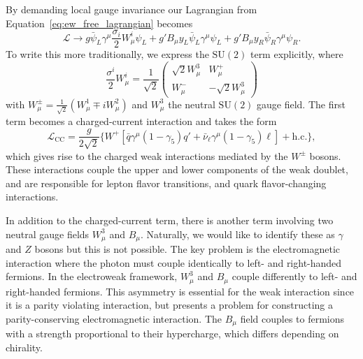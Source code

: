 By demanding local gauge invariance our Lagrangian from Equation~\ref{eq:ew_free_lagrangian} becomes 
\begin{equation}
  \mathcal{L} \to g\bar{\psi}_{L}\gamma^{\mu}\frac{\sigma_{i}}{2}W_{\mu}^{i}\psi_{L} + g'B_{\mu}y_{L}\bar{\psi}_{L}\gamma^{\mu}\psi_{L} + g'B_{\mu}y_{R}\bar{\psi}_{R}\gamma^{\mu}\psi_{R}.
  \label{eq:ew_lagrangian}
\end{equation}
To write this more traditionally, we express the $\mathrm{SU}(2)$ term explicitly, where
\begin{equation}
  \frac{\sigma^{i}}{2}W_{\mu}^{i} = \frac{1}{\sqrt{2}}\begin{pmatrix}
    \sqrt{2}W_{\mu}^{3} &  W_{\mu}^{+} \\
    W_{\mu}^{-} & -\sqrt{2}W_{\mu}^{3}
  \end{pmatrix}
\end{equation}
with $W_{\mu}^{\pm} = \frac{1}{\sqrt{2}}(W_{\mu}^{1} \mp iW_{\mu}^{2})$ and $W_{\mu}^{3}$ the neutral $\mathrm{SU}(2)$ gauge field. The first term becomes a charged-current interaction and takes the form
\begin{equation}
  \mathcal{L}_{\mathrm{CC}} = \frac{g}{2\sqrt{2}}\{W^{+}[\bar{q}\gamma^{\mu}(1-\gamma_{5})q' + \bar{\nu}_{\ell}\gamma^{\mu}(1 - \gamma_{5})\ell] + \mathrm{h.c.}\},
  \label{eq:ew_cc_lagrangian}
\end{equation}
which gives rise to the charged weak interactions mediated by the $W^{\pm}$ bosons. These interactions couple the upper and lower components of the weak doublet, and are responsible for lepton flavor transitions, and quark flavor-changing interactions. 

In addition to the charged-current term, there is another term involving two neutral gauge fields $W^{3}_{\mu}$ and $B_{\mu}$. Naturally, we would like to identify these as $\gamma$ and $Z$ bosons but this is not possible. The key problem is the electromagnetic interaction where the photon must couple identically to left- and right-handed fermions. In the electroweak framework, $W^{3}_{\mu}$ and $B_{\mu}$ couple differently to left- and right-handed fermions. This asymmetry is essential for the weak interaction since it is a parity violating interaction, but presents a problem for constructing a parity-conserving electromagnetic interaction. The $B_{\mu}$ field couples to fermions with a strength proportional to their hypercharge, which differs depending on chirality. 


